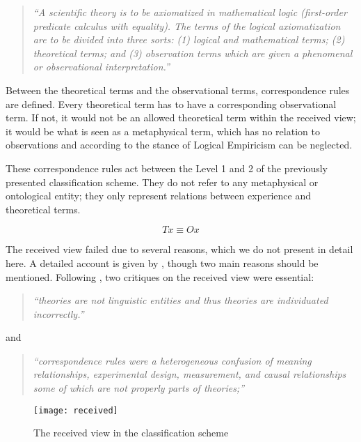 \documentclass{article}
\begin{document}
\begin{quote}
\textit{``A scientific theory is to be axiomatized in mathematical logic (first-order predicate calculus with equality). The terms of the logical axiomatization are to be divided into three sorts: (1) logical and mathematical terms; (2) theoretical terms; and (3) observation terms which are given a phenomenal or observational interpretation.''}
\end{quote}

Between the theoretical terms and the observational terms, correspondence rules are defined. Every theoretical term has to have a corresponding observational term. If not, it would not be an allowed theoretical term within the received view; it would be what is seen as a metaphysical term, which has no relation to observations and according to the stance of Logical Empiricism can be neglected. \newline

These correspondence rules act between the Level 1 and 2 of the previously presented classification scheme. They do not refer to any metaphysical or ontological entity; they only represent relations between experience and theoretical terms.  

\begin{equation}
Tx \equiv Ox
\label{Correspondence rules in the received view}
\end{equation}

The received view failed due to several reasons, which we do not present in detail here. A detailed account is given by \cite[]{suppe2000understanding}, though two main reasons should be mentioned. Following \cite[p.103]{suppe2000understanding}, two critiques on the received view were essential:

\begin{quote}
\textit{``theories are not linguistic entities and thus theories are individuated incorrectly.''}
\end{quote}

and

\begin{quote}
\textit{``correspondence rules were a heterogeneous confusion of meaning relationships, experimental design, measurement, and causal relationships some of which are not properly parts of theories;''}
\end{quote}

\begin{figure}[h]
\centering

\texttt{[image: received]}

\caption{The received view in the classification scheme}
\end{figure}
\end{document}
